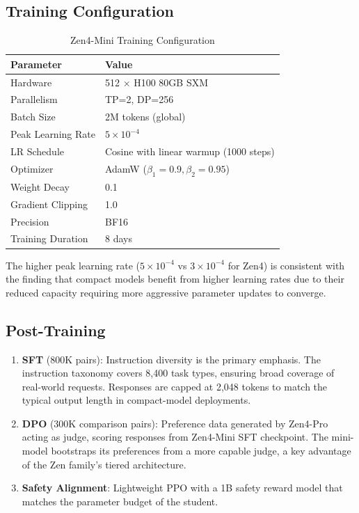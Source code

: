 \documentclass[11pt,a4paper]{article}
\begin{document}
\subsection{Training Configuration}

\begin{table}[H]
\centering
\begin{tabular}{ll}
\toprule
\textbf{Parameter} & \textbf{Value} \\
\midrule
Hardware           & 512 $\times$ H100 80GB SXM \\
Parallelism        & TP=2, DP=256 \\
Batch Size         & 2M tokens (global) \\
Peak Learning Rate & $5 \times 10^{-4}$ \\
LR Schedule        & Cosine with linear warmup (1000 steps) \\
Optimizer          & AdamW ($\beta_1=0.9, \beta_2=0.95$) \\
Weight Decay       & 0.1 \\
Gradient Clipping  & 1.0 \\
Precision          & BF16 \\
Training Duration  & 8 days \\
\bottomrule
\end{tabular}
\caption{Zen4-Mini Training Configuration}
\end{table}

The higher peak learning rate ($5 \times 10^{-4}$ vs $3 \times 10^{-4}$ for Zen4) is
consistent with the finding that compact models benefit from higher learning rates due
to their reduced capacity requiring more aggressive parameter updates to converge.

\subsection{Post-Training}

\begin{enumerate}
    \item \textbf{SFT} (800K pairs): Instruction diversity is the primary emphasis.
    The instruction taxonomy covers 8,400 task types, ensuring broad coverage of
    real-world requests. Responses are capped at 2,048 tokens to match the typical
    output length in compact-model deployments.
    \item \textbf{DPO} (300K comparison pairs): Preference data generated by Zen4-Pro
    acting as judge, scoring responses from Zen4-Mini SFT checkpoint. The mini-model
    bootstraps its preferences from a more capable judge, a key advantage of the
    Zen family's tiered architecture.
    \item \textbf{Safety Alignment}: Lightweight PPO with a 1B safety reward model
    that matches the parameter budget of the student.
\end{enumerate}
\end{document}
